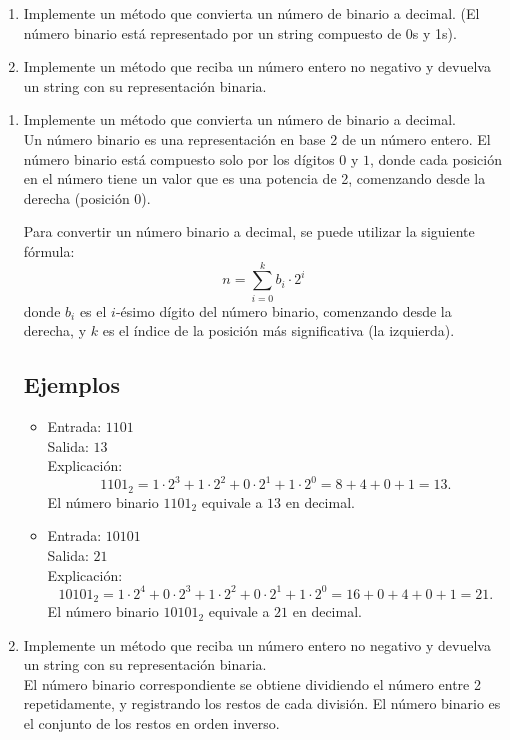 \begin{enumerate}[label=\alph*)]
    \item Implemente un método que convierta un número de binario a decimal. (El número binario está representado por un string compuesto de 0s y 1s).
    \item Implemente un método que reciba un número entero no negativo y devuelva un string con su representación binaria.
\end{enumerate}

\begin{enumerate}[label=\alph*)]
    \item Implemente un método que convierta un número de binario a decimal.\\
    Un número binario es una representación en base 2 de un número entero. El número binario está compuesto solo por los dígitos \(0\) y \(1\), donde cada posición en el número tiene un valor que es una potencia de 2, comenzando desde la derecha (posición 0).

    Para convertir un número binario a decimal, se puede utilizar la siguiente fórmula:
    \[
    n = \sum_{i=0}^{k} b_i \cdot 2^i
    \]
    donde \(b_i\) es el \(i\)-ésimo dígito del número binario, comenzando desde la derecha, y \(k\) es el índice de la posición más significativa (la izquierda).

    \subsection*{Ejemplos}
    \begin{itemize}
        \item Entrada: \( \text{1101} \) \\
        Salida: \( 13 \) \\
        Explicación:
        \[
        1101_2 = 1 \cdot 2^3 + 1 \cdot 2^2 + 0 \cdot 2^1 + 1 \cdot 2^0 = 8 + 4 + 0 + 1 = 13.
        \]
        El número binario \(1101_2\) equivale a \(13\) en decimal.

        \item Entrada: \( \text{10101} \) \\
        Salida: \( 21 \) \\
        Explicación:
        \[
        10101_2 = 1 \cdot 2^4 + 0 \cdot 2^3 + 1 \cdot 2^2 + 0 \cdot 2^1 + 1 \cdot 2^0 = 16 + 0 + 4 + 0 + 1 = 21.
        \]
        El número binario \(10101_2\) equivale a \(21\) en decimal.
    \end{itemize}

    \item Implemente un método que reciba un número entero no negativo y devuelva un string con su representación binaria.\\
    El número binario correspondiente se obtiene dividiendo el número entre 2 repetidamente, y registrando los restos de cada división. El número binario es el conjunto de los restos en orden inverso.


\end{enumerate}
